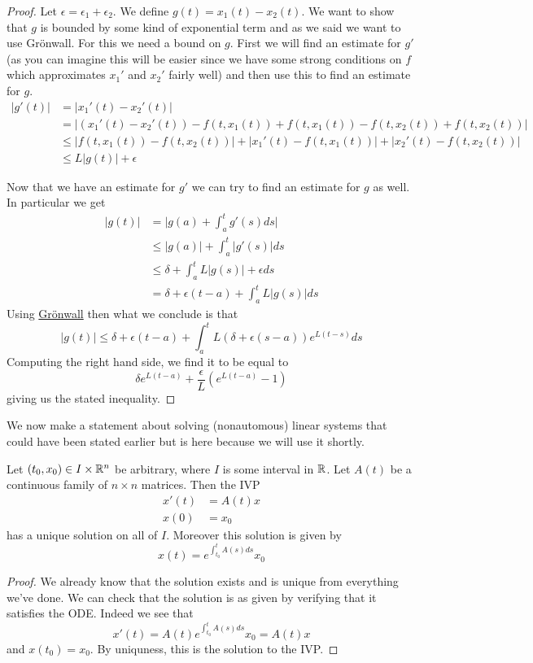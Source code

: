 \begin{proof}
    Let $\epsilon = \epsilon_1 + \epsilon_2$. We define $g(t) = x_1(t) - x_2(t)$. We want to show that $g$ is bounded by some kind of exponential term and as we said we want to use Grönwall. For this we need a bound on $g$. First we will find an estimate for $g'$ (as you can imagine this will be easier since we have some strong conditions on $f$ which approximates $x_1'$ and $x_2'$ fairly well) and then use this to find an estimate for $g$.
    \begin{align*}
        |g'(t)| &= |x_1'(t) - x_2'(t)|\\
        &= | (x_1'(t) - x_2'(t)) - f(t, x_1(t)) + f(t, x_1(t)) - f(t, x_2(t)) + f(t, x_2(t)) |\\
        &\leq |f(t, x_1(t)) - f(t, x_2(t))| + | x_1'(t) - f(t, x_1(t)) | + |x_2'(t) - f(t, x_2(t))|\\
        &\leq L |g(t)| + \epsilon
    \end{align*}
    
    Now that we have an estimate for $g'$ we can try to find an estimate for $g$ as well. In particular we get
    \begin{align*}
        |g(t)| &= \bigg| g(a) + \int_a^t g'(s) ds \bigg|\\
        &\leq |g(a)| + \int_a^t|g'(s)| ds\\
        &\leq \delta + \int_a^t L |g(s)| + \epsilon ds\\
        &= \delta + \epsilon(t - a) + \int_a^t L |g(s)| ds
    \end{align*}
    Using \hyperref[thm:big-gronwall]{Grönwall} then what we conclude is that
    $$ |g(t)| \leq \delta + \epsilon(t - a) + \int_a^t L(\delta + \epsilon(s - a)) e^{L(t - s)} ds $$
    Computing the right hand side, we find it to be equal to
    $$ \delta e^{L(t - a)} + \frac{\epsilon}{L} (e^{L(t - a)} - 1) $$
    giving us the stated inequality.
\end{proof}

We now make a statement about solving (nonautomous) linear systems that could have been stated earlier but is here because we will use it shortly.
\begin{corollary}\label{cor:cont-mat-exist}
Let $(t_0, x_0) \in I \times \mathbb{R}^n$ be arbitrary, where $I$ is some interval in $\mathbb{R}$. Let $A(t)$ be a continuous family of $n \times n$ matrices. Then the IVP
\begin{align*}
    x'(t) &= A(t)x\\
    x(0) &= x_0
\end{align*}
has a unique solution on all of $I$. Moreover this solution is given by
$$ x(t) = e^{\int_{t_0}^t A(s) ds} x_0 $$
\end{corollary}
\begin{proof}
    We already know that the solution exists and is unique from everything we've done. We can check that the solution is as given by verifying that it satisfies the ODE. Indeed we see that
    $$ x'(t) = A(t) e^{\int_{t_0}^t A(s) ds} x_0 = A(t) x $$
    and $x(t_0) = x_0$. By uniquness, this is the solution to the IVP.
\end{proof}

